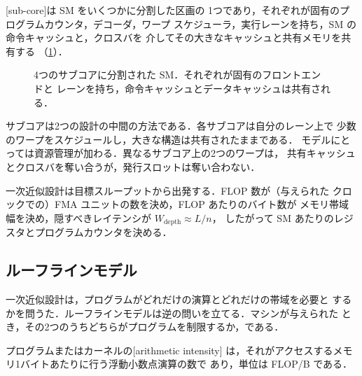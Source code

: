 \documentclass[../main.tex]{subfiles}
\begin{document}
\begin{definition}[サブコア]
  \label{def:l08-sub-core}
  [sub-core]は SM をいくつかに分割した区画の
  1つであり，それぞれが固有のプログラムカウンタ，デコーダ，ワープ
  スケジューラ，実行レーンを持ち，SM の命令キャッシュと，クロスバを
  介してその大きなキャッシュと共有メモリを共有する
  （\cref{fig:l08-subcore}）．
\end{definition}

\begin{figure}[tb]
  \centering
  
  \caption{4つのサブコアに分割された SM．それぞれが固有のフロントエンドと
    レーンを持ち，命令キャッシュとデータキャッシュは共有される．}
  \label{fig:l08-subcore}
\end{figure}

サブコアは2つの設計の中間の方法である．各サブコアは自分のレーン上で
少数のワープをスケジュールし，大きな構造は共有されたままである．
モデルにとっては資源管理が加わる．異なるサブコア上の2つのワープは，
共有キャッシュとクロスバを奪い合うが，発行スロットは奪い合わない．

\begin{keypoint}
  一次近似設計は目標スループットから出発する．FLOP 数が（与えられた
  クロックでの）FMA ユニットの数を決め，FLOP あたりのバイト数が
  メモリ帯域幅を決め，隠すべきレイテンシが $W_{\text{depth}} \approx L/n$，
  したがって SM あたりのレジスタとプログラムカウンタを決める．
\end{keypoint}

\subsection{ルーフラインモデル}

一次近似設計は，プログラムがどれだけの演算とどれだけの帯域を必要と
するかを問うた．ルーフラインモデルは逆の問いを立てる．マシンが与えられた
とき，その2つのうちどちらがプログラムを制限するか，である．

\begin{definition}[演算強度]
  \label{def:l08-arithmetic-intensity}
  プログラムまたはカーネルの[arithmetic intensity]
  は，それがアクセスするメモリ1バイトあたりに行う浮動小数点演算の数で
  あり，単位は FLOP/B である．
\end{definition}
\end{document}
